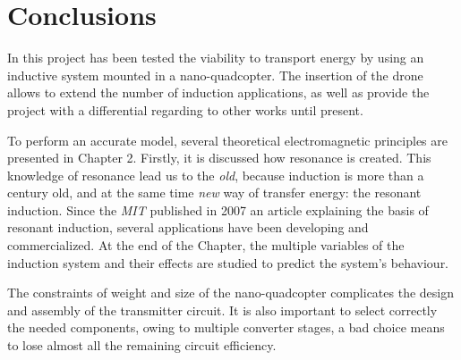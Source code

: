\cleardoublepage
{}
\chapter*{Conclusions}

In this project has been tested the viability to transport energy by using an inductive system mounted in a nano-quadcopter. The insertion of the drone allows to extend the number of induction applications, as well as provide the project with a differential regarding to other works until present.





To perform an accurate model, several theoretical electromagnetic principles are presented in Chapter 2. Firstly, it is discussed how resonance is created. This knowledge of resonance lead us to the \textit{old}, because induction is more than a century old, and at the same time \textit{new} way of transfer energy: the resonant induction. Since the \textit{MIT} published in 2007 an article explaining the basis of resonant induction, several applications have been developing and commercialized. At the end of the Chapter, the multiple variables of the induction system and their effects are studied to predict the system's behaviour.

The constraints of weight and size of the nano-quadcopter complicates the design and assembly of the transmitter circuit. It is also important to select correctly the needed components, owing to multiple converter stages, a bad choice means to lose almost all the remaining circuit efficiency.


